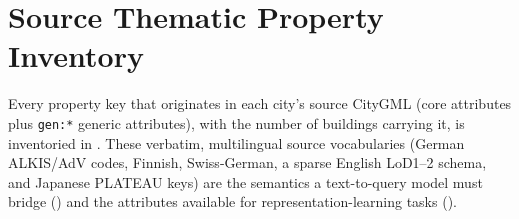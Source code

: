 \documentclass[sigconf,authordraft]{acmart}
\begin{document}



\section{Source Thematic Property Inventory}\label{app:thematic}

Every property key that originates in each city's source CityGML (core attributes plus \texttt{gen:*} generic attributes), with the number of buildings carrying it, is inventoried in . These verbatim, multilingual source vocabularies (German ALKIS/AdV codes, Finnish, Swiss-German, a sparse English LoD1--2 schema, and Japanese PLATEAU keys) are the semantics a text-to-query model must bridge () and the attributes available for representation-learning tasks ().
\end{document}
